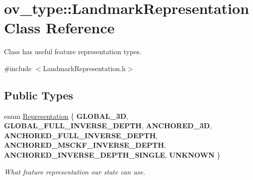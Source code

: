 \hypertarget{classov__type_1_1LandmarkRepresentation}{}\section{ov\+\_\+type\+:\+:Landmark\+Representation Class Reference}
\label{classov__type_1_1LandmarkRepresentation}


Class has useful feature representation types.  




{\ttfamily \#include $<$Landmark\+Representation.\+h$>$}

\subsection*{Public Types}
\begin{DoxyCompactItemize}
\item 
\mbox{\label{classov__type_1_1LandmarkRepresentation_a7f5783df6932ace7f098ae243b6d298e}} 
enum \hyperlink{classov__type_1_1LandmarkRepresentation_a7f5783df6932ace7f098ae243b6d298e}{Representation} \{ \newline
{\bfseries G\+L\+O\+B\+A\+L\+\_\+3D}, 
{\bfseries G\+L\+O\+B\+A\+L\+\_\+\+F\+U\+L\+L\+\_\+\+I\+N\+V\+E\+R\+S\+E\+\_\+\+D\+E\+P\+TH}, 
{\bfseries A\+N\+C\+H\+O\+R\+E\+D\+\_\+3D}, 
{\bfseries A\+N\+C\+H\+O\+R\+E\+D\+\_\+\+F\+U\+L\+L\+\_\+\+I\+N\+V\+E\+R\+S\+E\+\_\+\+D\+E\+P\+TH}, 
\newline
{\bfseries A\+N\+C\+H\+O\+R\+E\+D\+\_\+\+M\+S\+C\+K\+F\+\_\+\+I\+N\+V\+E\+R\+S\+E\+\_\+\+D\+E\+P\+TH}, 
{\bfseries A\+N\+C\+H\+O\+R\+E\+D\+\_\+\+I\+N\+V\+E\+R\+S\+E\+\_\+\+D\+E\+P\+T\+H\+\_\+\+S\+I\+N\+G\+LE}, 
{\bfseries U\+N\+K\+N\+O\+WN}
 \}\begin{DoxyCompactList}\small\item\em What feature representation our state can use. \end{DoxyCompactList}
\end{DoxyCompactItemize}
